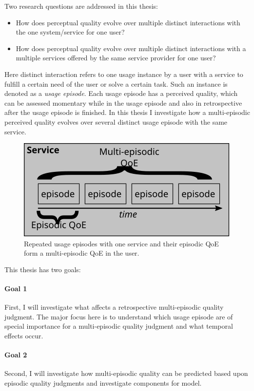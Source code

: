 Two research questions are addressed in this thesis:
\begin{itemize}
\item How does perceptual quality evolve over multiple distinct interactions with the one system/service for one user?
\item How does perceptual quality evolve over multiple distinct interactions with a multiple services offered by the same service provider for one user?
\end{itemize}

Here distinct interaction refers to one usage instance by a user with a service to fulfill a certain need of the user or solve a certain task.
Such an instance is denoted as a \emph{usage episode}.
Each usage episode has a perceived quality, which can be assessed momentary while in the usage episode and also in retrospective after the usage episode is finished.
In this thesis I investigate how a multi-episodic perceived quality evolves over several distinct usage episode with the same service.

\begin{figure}
	\centering
	\includegraphics[width=1\columnwidth]{fig/multi-episodic}
	\caption{Repeated usage episodes with one service and their episodic QoE form a multi-episodic QoE in the user.}
	\label{img:chap01:multi-episodic}
\end{figure}

This thesis has two goals:
\paragraph*{Goal 1}
First, I will investigate what affects a retrospective multi-episodic quality judgment.
The major focus here is to understand which usage episode are of special importance for a multi-episodic quality judgment and what temporal effects occur.

\paragraph*{Goal 2}
Second, I will investigate how multi-episodic quality can be predicted based upon episodic quality judgments and investigate components for model.

